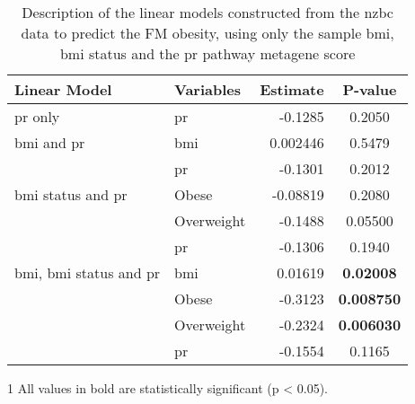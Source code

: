 	\begin{table}[htpb]
		\centering
		\caption[Description of the linear models constructed from the \gls{nzbc} data to predict the FM obesity, using only the sample \gls{bmi}, \gls{bmi} status and the \acrshort{pr} pathway metagene score]{Description of the linear models constructed from the \gls{nzbc} data to predict the FM obesity, using only the sample \gls{bmi}, \gls{bmi} status and the \gls{pr} pathway metagene score}
		\label{tab:lm_pr_only_fm}
		\begin{threeparttable}
			\begin{tabular}{llrc}
				Linear Model & Variables & Estimate & {P-value}\\
					\hline
					\hline
					\rule{0pt}{2.25ex}\gls{pr} only                            & \gls{pr}   & -0.1285  & 0.2050   \\
					\hline
					\rule{0pt}{2.25ex}\gls{bmi} and \gls{pr}                   & \gls{bmi}  & 0.002446 & 0.5479   \\
                                                                               & \gls{pr}   & -0.1301  & 0.2012   \\
					\hline
					\rule{0pt}{2.25ex}\gls{bmi} status and \gls{pr}            & Obese      & -0.08819 & 0.2080   \\
                                                                               & Overweight & -0.1488  & 0.05500  \\
                                                                               & \gls{pr}   & -0.1306  & 0.1940   \\
					\hline
					\rule{0pt}{2.25ex}\gls{bmi}, \gls{bmi} status and \gls{pr} & \gls{bmi}  & 0.01619  & \bfseries 0.02008 \tnote{1}\\
                                                                               & Obese      & -0.3123  & \bfseries 0.008750  \\
                                                                               & Overweight & -0.2324  & \bfseries 0.006030  \\
                                                                               & \gls{pr}   & -0.1554  & 0.1165   \\
					\hline
					\hline
			\end{tabular}
				\begin{tablenotes}
					\begin{footnotesize}
					\item [1] All values in bold are statistically significant (p \textless{} 0.05).
					\end{footnotesize}
				\end{tablenotes}
		\end{threeparttable}
	\end{table}

